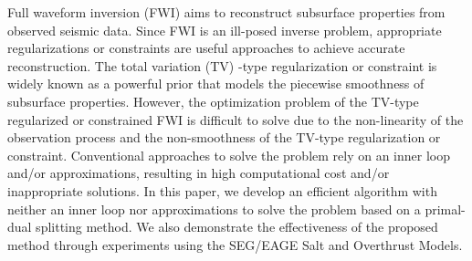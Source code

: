 \begin{summary}
    Full waveform inversion (FWI) aims to reconstruct subsurface properties from observed seismic data.
    Since FWI is an ill-posed inverse problem, appropriate regularizations or constraints are useful approaches to achieve accurate reconstruction.
    The total variation (TV) -type regularization or constraint is widely known as a powerful prior that models the piecewise smoothness of subsurface properties.
    However, the optimization problem of the TV-type regularized or constrained FWI is difficult to solve due to the non-linearity of the observation process and the non-smoothness of the TV-type regularization or constraint.
    Conventional approaches to solve the problem rely on an inner loop and/or approximations, resulting in high computational cost and/or inappropriate solutions.
    In this paper, we develop an efficient algorithm with neither an inner loop nor approximations to solve the problem based on a primal-dual splitting method.
    We also demonstrate the effectiveness of the proposed method through experiments using the SEG/EAGE Salt and Overthrust Models.
\end{summary}
